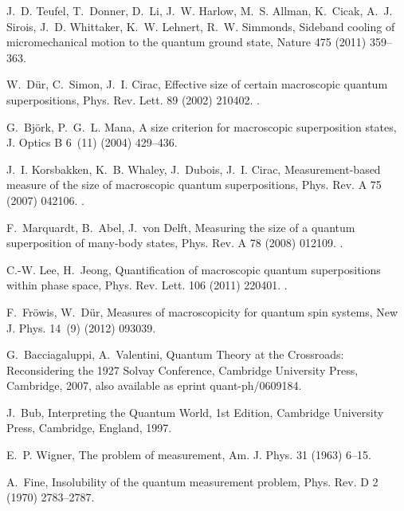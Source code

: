 \documentclass[3p,sort&compress,12pt]{elsarticle}
\begin{document}
\begin{thebibliography}{100}
J.~D. Teufel, T.~Donner, D.~Li, J.~W. Harlow, M.~S. Allman, K.~Cicak, A.~J.
  Sirois, J.~D. Whittaker, K.~W. Lehnert, R.~W. Simmonds, Sideband cooling of
  micromechanical motion to the quantum ground state, Nature 475 (2011)
  359--363.

W.~D\"ur, C.~Simon, J.~I. Cirac, Effective size of certain macroscopic quantum
  superpositions, Phys. Rev. Lett. 89 (2002) 210402.
\newblock \href {http://dx.doi.org/10.1103/PhysRevLett.89.210402}
  {}.

G.~Bj{\"o}rk, P.~G.~L. Mana, A size criterion for macroscopic superposition
  states, J. Optics B 6~(11) (2004) 429--436.

J.~I. Korsbakken, K.~B. Whaley, J.~Dubois, J.~I. Cirac, Measurement-based
  measure of the size of macroscopic quantum superpositions, Phys. Rev. A 75
  (2007) 042106.
\newblock \href {http://dx.doi.org/10.1103/PhysRevA.75.042106}
  {}.

F.~Marquardt, B.~Abel, J.~von Delft, Measuring the size of a quantum
  superposition of many-body states, Phys. Rev. A 78 (2008) 012109.
\newblock \href {http://dx.doi.org/10.1103/PhysRevA.78.012109}
  {}.

C.-W. Lee, H.~Jeong, Quantification of macroscopic quantum superpositions
  within phase space, Phys. Rev. Lett. 106 (2011) 220401.
\newblock \href {http://dx.doi.org/10.1103/PhysRevLett.106.220401}
  {}.

F.~Fr{\"o}wis, W.~D{\"u}r, Measures of macroscopicity for quantum spin systems,
  New J. Phys. 14~(9) (2012) 093039.

G.~Bacciagaluppi, A.~Valentini, Quantum Theory at the Crossroads: Reconsidering
  the 1927 Solvay Conference, Cambridge University Press, Cambridge, 2007, also
  available as eprint quant-ph/0609184.

J.~Bub, Interpreting the Quantum World, 1st Edition, Cambridge University
  Press, Cambridge, England, 1997.

E.~P. Wigner, The problem of measurement, Am. J. Phys. 31 (1963) 6--15.

A.~Fine, Insolubility of the quantum measurement problem, Phys. Rev. D 2 (1970)
  2783--2787.


\end{thebibliography}
\end{document}
